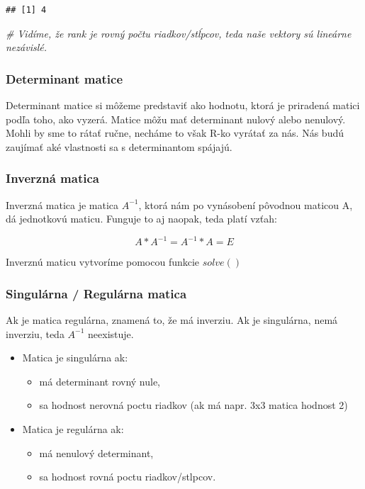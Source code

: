\documentclass[]{article}
\newenvironment{Shaded}{\begin{snugshade}}{\end{snugshade}}
\newcommand{\CommentTok}[1]{\textcolor[rgb]{0.56,0.35,0.01}{\textit{#1}}}
\providecommand{\tightlist}{%
  \setlength{\itemsep}{0pt}\setlength{\parskip}{0pt}}
\begin{document}
\begin{verbatim}
## [1] 4
\end{verbatim}

\begin{Shaded}
\begin{Highlighting}[]
\CommentTok{# Vidíme, že rank je rovný počtu riadkov/stĺpcov, teda naše vektory sú lineárne nezávislé.}
\end{Highlighting}
\end{Shaded}

\hypertarget{determinant-matice}{%
\subsubsection{Determinant matice}\label{determinant-matice}}

Determinant matice si môžeme predstaviť ako hodnotu, ktorá je priradená
matici podľa toho, ako vyzerá. Matice môžu mať determinant nulový alebo
nenulový. Mohli by sme to rátať ručne, necháme to však R-ko vyrátať za
nás. Nás budú zaujímať aké vlastnosti sa s determinantom spájajú.

\hypertarget{inverznuxe1-matica}{%
\subsubsection{Inverzná matica}\label{inverznuxe1-matica}}

Inverzná matica je matica \(A^{-1}\), ktorá nám po vynásobení pôvodnou
maticou A, dá jednotkovú maticu. Funguje to aj naopak, teda platí vzťah:

\[A * A^{-1} = A^{-1} * A = E\]

Inverznú maticu vytvoríme pomocou funkcie \(solve()\)

\hypertarget{singuluxe1rna-reguluxe1rna-matica}{%
\subsubsection{Singulárna / Regulárna
matica}\label{singuluxe1rna-reguluxe1rna-matica}}

Ak je matica regulárna, znamená to, že má inverziu. Ak je singulárna,
nemá inverziu, teda \(A^{-1}\) neexistuje.

\begin{itemize}
\tightlist
\item
  Matica je singulárna ak:

  \begin{itemize}
  \tightlist
  \item
    má determinant rovný nule,
  \item
    sa hodnost nerovná poctu riadkov (ak má napr. 3x3 matica hodnost 2)
  \end{itemize}
\item
  Matica je regulárna ak:

  \begin{itemize}
  \tightlist
  \item
    má nenulový determinant,
  \item
    sa hodnost rovná poctu riadkov/stlpcov.
  \end{itemize}
\end{itemize}
\end{document}
